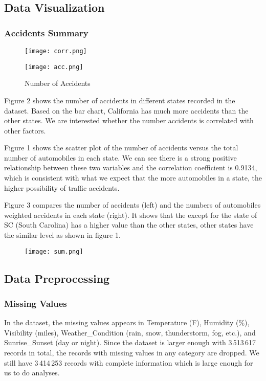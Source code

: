 \documentclass[twocolumn]{article}
\begin{document}
\subsection{Data Visualization}
\subsubsection{Accidents Summary}
\begin{figure}[h]
    \centering
    \texttt{[image: corr.png]}
    \caption{}
\end{figure}

\begin{figure}[h]
    \centering
    \texttt{[image: acc.png]}
    \caption{Number of Accidents}
\end{figure}

Figure 2 shows the number of accidents in different states recorded in the dataset. Based on the bar chart, California has much more accidents than the other states. We are interested whether the number accidents is correlated with other factors.

Figure 1 shows the scatter plot of the number of accidents versus the total number of automobiles in each state. We can see there is a strong positive relationship between these two variables and the correlation coefficient is 0.9134, which is consistent with what we expect that the more automobiles in a state, the higher possibility of traffic accidents.

Figure 3 compares the number of accidents (left) and the numbers of automobiles weighted accidents in each state (right). It shows that the except for the state of SC (South Carolina) has a higher value  than the other states, other states have the similar level as shown in figure 1. 


\begin{figure}[h]
    \centering
    \texttt{[image: sum.png]}
    \caption{}
\end{figure}

\subsection{Data Preprocessing}
\subsubsection{Missing Values}
In the dataset, the missing values appears in Temperature (F), Humidity (\%), Visibility (miles), Weather\_Condition (rain, snow, thunderstorm, fog, etc.), and Sunrise\_Sunset (day or night). Since the dataset is larger enough with 3\,513\,617 records in total, the records with missing values in any category are dropped. We still have 3\,414\,253 records with complete information which is large enough for us to do analyses.
\end{document}
